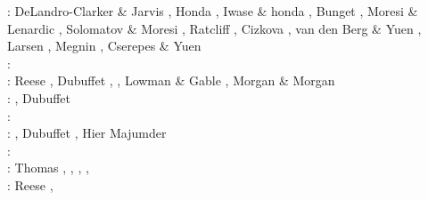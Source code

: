 \begin{scriptsize}
\nineteenninetyseven: DeLandro-Clarker \& Jarvis \cite{deja97}, Honda \cite{hond97}, 
                      Iwase \& honda \cite{iwho97}, Bunget \etal \cite{burb97},
                      Moresi \& Lenardic \cite{mole97}, Solomatov \& Moresi \cite{somo97},
                      Ratcliff \etal \cite{rats97}, Cizkova \etal \cite{cicv97},
                      van den Berg \& Yuen \cite{vayu97}, Larsen \etal \cite{laym97},
                      Megnin \etal \cite{mebr97}, Cserepes \& Yuen \cite{csyu97}\\
\nineteenninetyeight: \cite{ande98}\cite{iwho98}\cite{devv98}\cite{tack98}\cite{tack98b}\cite{trha98b}
      \cite{trha98}\cite{burl98}\cite{mokm98}\cite{lena98}\cite{vayu98}\cite{wema98}\\
\nineteenninetynine: Reese \etal \cite{resb99}, Dubuffet \etal \cite{duyr99}, 
                     \cite{vazh99}\cite{dava99}
                     \cite{tabg99}\cite{como99}
                     \cite{cicv99}\cite{trrj99},
                     Lowman \& Gable \cite{loga99}, Morgan \& Morgan \cite{momo99}\\ 
\twothousand: \cite{albe00}\cite{hayu00}
              \cite{devv00b}\cite{tack00}
              \cite{tack00b}\cite{tack00c}
              \cite{tack00d}\cite{zhzm00}
              \cite{legm00}\cite{conr00}
              \cite{somo00},  Dubuffet \etal \cite{duyu00,duyy00}\\
\twothousandone: \cite{vank01}\cite{riyb01}
                 \cite{lemo01}\cite{vays01}
                 \cite{moqu01}\cite{zhon01}
                 \cite{burm01}\cite{dabu01}\\
\twothousandtwo: \cite{tasu02}\cite{modm02}
                 \cite{tack02}\cite{vaya02}
                 \cite{vayu02}\cite{taxi02}
                 \cite{scbh02}\cite{strb02}, 
                 Dubuffet \etal \cite{duyr02}, Hier Majumder \etal{} \cite{hiys02}\\
\twothousandthree: \cite{hapa03}\cite{lemo03}
                   \cite{mumc03}\cite{fasa03}
                   \cite{heta03}\cite{sibu03}
                   \cite{ogaw03,ogaw03b}\\
\twothousandfour: Thomas \etal \cite{thkl04}, \cite{vavv04b}
                  \cite{xita04b}\cite{xita04},
                  \cite{nata04b}\cite{vayr04},
                  \cite{brws04}\cite{stsh04},
                  \cite{scbh04}\\
\twothousandfive: Reese \etal \cite{resb05}, \cite{taxn05}
                  \cite{bupc05}\cite{grlt05}
                  \cite{lemj05}\cite{kogk05}

\end{scriptsize}
